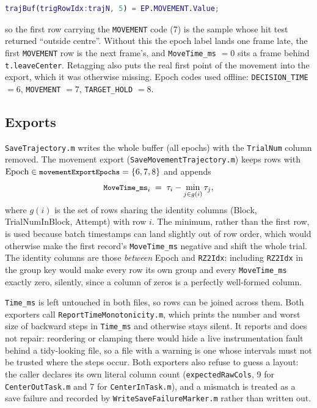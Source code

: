 \documentclass[11pt,a4paper]{article}
\newcommand{\code}[1]{\texttt{\small #1}}
\newcommand{\file}[1]{\texttt{\small #1}}
\begin{document}
\begin{lstlisting}[language=Matlab]
trajBuf(trigRowIdx:trajN, 5) = EP.MOVEMENT.Value;
\end{lstlisting}

\noindent
so the first row carrying the \code{MOVEMENT} code (7) is the sample whose hit
test returned ``outside centre''. Without this the epoch label lands one frame
late, the first \code{MOVEMENT} row is the next frame's, and
\code{MoveTime\_ms} $= 0$ sits a frame behind \code{t.leaveCenter}. Retagging
also puts the real first point of the movement into the export, which it was
otherwise missing. Epoch codes used offline: \code{DECISION\_TIME} $= 6$,
\code{MOVEMENT} $= 7$, \code{TARGET\_HOLD} $= 8$.

\subsection{Exports}

\file{SaveTrajectory.m} writes the whole buffer (all epochs) with the
\code{TrialNum} column removed. The movement export
(\file{SaveMovementTrajectory.m}) keeps rows with
$\text{Epoch} \in \code{movementExportEpochs} = \{6, 7, 8\}$ and appends
\begin{equation}
  \code{MoveTime\_ms}_i \;=\; \tau_i - \min_{j \in g(i)} \tau_j,
  \label{eq:movetime}
\end{equation}
where $g(i)$ is the set of rows sharing the identity columns (Block,
TrialNumInBlock, Attempt) with row $i$. The minimum, rather than the first row,
is used because batch timestamps can land slightly out of row order, which would
otherwise make the first record's \code{MoveTime\_ms} negative and shift the
whole trial. The identity columns are those \emph{between} Epoch and
\code{RZ2Idx}: including \code{RZ2Idx} in the group key would make every row its
own group and every \code{MoveTime\_ms} exactly zero, silently, since a column
of zeros is a perfectly well-formed column.

\code{Time\_ms} is left untouched in both files, so rows can be joined across
them. Both exporters call \file{ReportTimeMonotonicity.m}, which prints the
number and worst size of backward steps in \code{Time\_ms} and otherwise stays
silent. It reports and does not repair: reordering or clamping there would hide
a live instrumentation fault behind a tidy-looking file, so a file with a
warning is one whose intervals must not be trusted where the steps occur. Both
exporters also refuse to guess a layout: the caller declares its own literal
column count (\code{expectedRawCols}, 9 for \file{CenterOutTask.m} and 7 for
\file{CenterInTask.m}), and a mismatch is treated as a save failure and recorded
by \file{WriteSaveFailureMarker.m} rather than written out.
\end{document}
